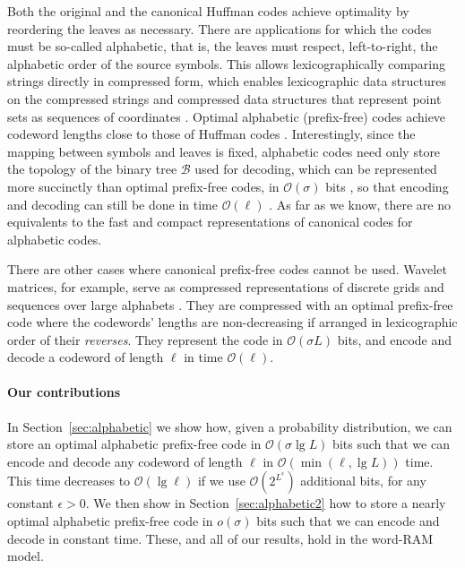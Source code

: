 \documentclass[preprint,12pt]{elsarticle}
\newcommand{\Oh}[1]{\ensuremath{\mathcal{O}\!\left({#1}\right)}}
\newcommand{\B}{\mathcal{B}}
\renewcommand{\log}{\lg}
\begin{document}
Both the original and the canonical Huffman codes achieve optimality by 
reordering the leaves as necessary. There are applications for which the 
codes must be so-called alphabetic, that is, the leaves must respect, 
left-to-right, the alphabetic order of the source symbols. This allows
lexicographically comparing strings directly in compressed form, which enables
lexicographic data structures on the compressed strings \cite{BNO12,MPBCCN15}
and compressed data structures that represent point sets as sequences of 
coordinates \cite{Nav14}. Optimal alphabetic (prefix-free) codes achieve 
codeword lengths close to those of Huffman 
codes \cite{HT71}. Interestingly, since the mapping between symbols and leaves 
is fixed, alphabetic codes need only store the topology of the binary tree 
$\B$ used for decoding, which can be represented more succinctly than optimal 
prefix-free codes, in $\Oh{\sigma}$ bits \cite{MR01}, so that encoding and 
decoding can still be done in time $\Oh{\ell}$ \cite{GNNO15}. As far as we 
know, there are no equivalents to the fast and compact representations of 
canonical codes for alphabetic codes.

There are other cases where canonical prefix-free codes cannot be used.
Wavelet matrices, for example, serve as compressed representations of discrete 
grids and sequences over large alphabets \cite{CNO15}. They are compressed with
an optimal prefix-free code where the codewords' lengths are non-decreasing if 
arranged in lexicographic order of their {\em reverses}. They 
represent the code in $\Oh{\sigma L}$ bits, and encode and decode a codeword 
of length $\ell$ in time $\Oh{\ell}$. 

\paragraph{Our contributions}

In Section~\ref{sec:alphabetic} we show how, given a probability distribution,
we can store an optimal alphabetic prefix-free code in $\Oh{\sigma \log L}$ 
bits such that we can encode and decode any codeword of length $\ell$ in 
$\Oh{\min (\ell, \log L)}$ time. This time decreases to $\Oh{\log \ell}$ 
if we use $\Oh{2^{L^\epsilon}}$ additional bits, for any constant $\epsilon>0$.
We then show in Section~\ref{sec:alphabetic2}
how to store a nearly optimal alphabetic prefix-free code in 
\(o (\sigma)\) bits such that we can encode and decode in constant time.  
These, and all of our results, hold in the word-RAM model.
\end{document}
